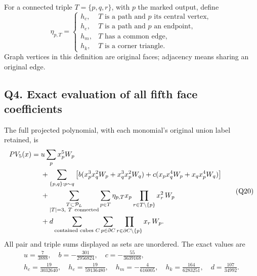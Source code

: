 \documentclass[11pt]{article}
\begin{document}
For a connected triple \(T=\{p,q,r\}\), with \(p\) the marked output, define
\[
 \eta_{p,T}=
 \begin{cases}
 h_c,&T\text{ is a path and }p\text{ its central vertex},\\
 h_e,&T\text{ is a path and }p\text{ an endpoint},\\
 h_m,&T\text{ has a common edge},\\
 h_k,&T\text{ is a corner triangle}.
 \end{cases}\tag{Q19}
\]
Graph vertices in this definition are original faces; adjacency means sharing an original edge.

\subsection*{Q4. Exact evaluation of all fifth face coefficients}

The full projected polynomial, with each monomial's original union label retained, is
\[
 \begin{aligned}
 PV_5(x)={}&u\sum_p x_p^5W_p\\
 &+\sum_{\{p,q\}:p\sim q}
 \left[
 b(x_p^3x_q^2W_p+x_q^3x_p^2W_q)
 +c(x_px_q^4W_p+x_qx_p^4W_q)\right]\\
 &+\sum_{\substack{T\subset\mathcal P_L\\|T|=3,\ T\ {\rm connected}}}
       \sum_{p\in T}\eta_{p,T}x_p
                     \prod_{r\in T\setminus\{p\}}x_r^2\,W_p\\
 &+d\sum_{\text{contained cubes }C}\sum_{p\in\partial C}
                       \prod_{r\in\partial C\setminus\{p\}}x_r\,W_p .
 \end{aligned}\tag{Q20}
\]
All pair and triple sums displayed as sets are unordered. The exact values are
\[
 \boxed{
 \begin{gathered}
 u=\frac7{3888},\quad b=-\frac{301}{2956824},\quad
 c=-\frac{55}{3639168},\\
 h_c=\frac{19}{3032640},\quad h_e=\frac{19}{59136480},\quad
 h_m=-\frac4{616005},\quad h_k=\frac{164}{6283251},\quad
 d=\frac{107}{34992}.
 \end{gathered}}
\]
\end{document}
